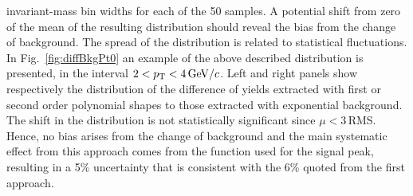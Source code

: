 invariant-mass bin widths for each of the
50 samples. 
A potential shift from zero of the mean of the resulting distribution 
 should reveal the bias from the change of background. The
  spread of the distribution is related to statistical fluctuations. 
  In Fig.~\ref{fig:diffBkgPt0} an example of the above 
  described distribution is presented, in the interval $2 < p_{\rm T} < 4\, \mathrm{GeV}/c$.
  Left and right panels show respectively the distribution of the difference
  of yields extracted with first or second order polynomial shapes to those extracted with exponential
  background. The shift in the distribution is not statistically significant 
 since $\mu < 3\,$RMS. Hence, no bias arises from the change of background
 and the main systematic effect from this approach comes from the function used for the 
 signal peak, resulting in a 5\% uncertainty that is consistent with the 6\% quoted from the first approach.\\
 
